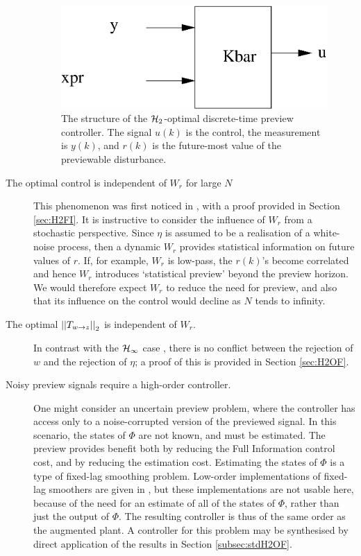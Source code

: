\begin{description}
{
\stdcontrolfrags
{}
\begin{figure}
\begin{center}
\includegraphics[width=0.42\columnwidth]{./diags/PrevContStructxpKbar.eps}
\caption{\label{fig:PrevContStructxp} The structure of the $\mathcal H_2$-optimal discrete-time preview controller. The signal $u(k)$ is the control, the measurement is $y(k)$, and $r(k)$ is the future-most value of the previewable disturbance.}
\end{center}
\end{figure}}\item[The optimal control is independent of $W_r$ for large $N$]
This phenomenon was first noticed in \cite{Tomizuka_1975_OptDiscretePreview}, with a proof provided in Section \ref{sec:H2FI}. It is instructive to consider the influence of $W_r$ from a stochastic perspective. Since $\eta$ is assumed to be a realisation of a white-noise process, then a dynamic $W_r$ provides statistical information on future values of $r$. If, for example, $W_r$ is low-pass, the $r(k)$'s become correlated and hence $W_r$ introduces `statistical preview' beyond the preview horizon. We would therefore expect $W_r$ to reduce the need for preview, and also that its influence on the control would decline as $N$ tends to infinity.
\item[The optimal $\left|\left| T_{w\rightarrow z} \right|\right|_2$ is independent of $W_r$.]
In contrast with the $\mathcal H_\infty$ case \cite{Hazell_2007_DiscreteHinfPreview}, there is no conflict between the rejection of $w$ and the rejection of $\eta$; a proof of this is provided in Section \ref{sec:H2OF}.
\item[Noisy preview signals require a high-order controller.]
One might consider an uncertain preview problem, where the controller has access only to a noise-corrupted version of the previewed signal. 
In this scenario, the states of $\Phi$ are not known, and must be estimated. The preview provides benefit both by reducing the Full Information control cost, and by reducing the estimation cost. Estimating the states of $\Phi$ is a type of fixed-lag smoothing problem. Low-order implementations of fixed-lag smoothers are given in \cite{Anderson_1979_OptimalFiltering}, but these implementations are not usable here, because of the need for an estimate of all of the states of $\Phi$, rather than just the output of $\Phi$. The resulting controller is thus of the same order as the augmented plant. A controller for this problem may be synthesised by direct application of the results in Section \ref{subsec:stdH2OF}.
\end{description}
